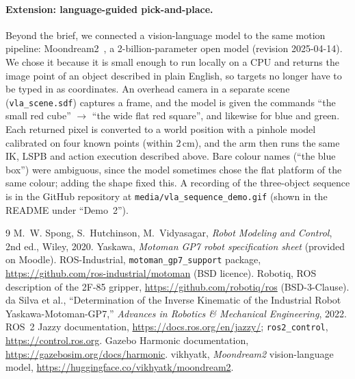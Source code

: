 \documentclass[11pt,a4paper]{article}
\begin{document}
\paragraph{Extension: language-guided pick-and-place.}
Beyond the brief, we connected a vision-language model to the same motion pipeline:
Moondream2~\cite{moondream}, a 2-billion-parameter open model (revision 2025-04-14). We
chose it because it is small enough to run locally on a CPU and returns the image point of
an object described in plain English, so targets no longer have to be typed in as
coordinates. An overhead camera in a separate scene (\texttt{vla\_scene.sdf}) captures a
frame, and the model is given the commands ``the small red cube'' \(\to\) ``the wide flat
red square'', and likewise for blue and green. Each returned pixel is converted to a world
position with a pinhole model calibrated on four known points (within 2\,cm), and the
arm then runs the same IK, LSPB and action execution described above. Bare colour names
(``the blue box'') were ambiguous, since the model sometimes chose the flat platform of the
same colour; adding the shape fixed this. A recording of the three-object sequence is in the
GitHub repository at \texttt{media/vla\_sequence\_demo.gif} (shown in the README under
``Demo~2'').

\begin{thebibliography}{9}\small\setlength{\itemsep}{0pt}\setlength{\parsep}{0pt}
 M.~W. Spong, S.~Hutchinson, M.~Vidyasagar, \emph{Robot Modeling and Control}, 2nd ed., Wiley, 2020.
 Yaskawa, \emph{Motoman GP7 robot specification sheet} (provided on Moodle).
 ROS-Industrial, \texttt{motoman\_gp7\_support} package, \url{https://github.com/ros-industrial/motoman} (BSD licence).
 Robotiq, ROS description of the 2F-85 gripper, \url{https://github.com/robotiq/ros} (BSD-3-Clause).
 da Silva et al., ``Determination of the Inverse Kinematic of the Industrial Robot Yaskawa-Motoman-GP7,'' \emph{Advances in Robotics \& Mechanical Engineering}, 2022.
 ROS~2 Jazzy documentation, \url{https://docs.ros.org/en/jazzy/}; \texttt{ros2\_control}, \url{https://control.ros.org}.
 Gazebo Harmonic documentation, \url{https://gazebosim.org/docs/harmonic}.
 vikhyatk, \emph{Moondream2} vision-language model, \url{https://huggingface.co/vikhyatk/moondream2}.
\end{thebibliography}
\end{document}
